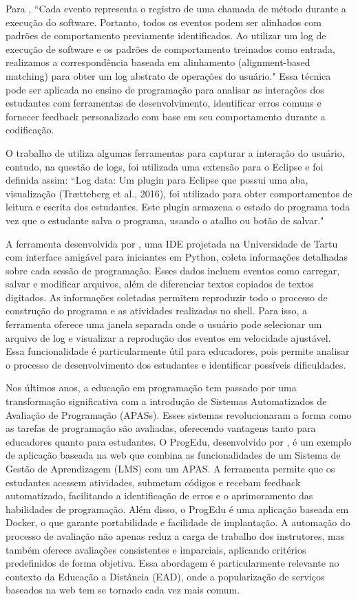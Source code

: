Para \cite{liu2018user}, ``Cada evento representa o registro de uma chamada de método durante a execução do software. Portanto, todos os eventos podem ser alinhados com padrões de comportamento previamente identificados. Ao utilizar um log de execução de software e os padrões de comportamento treinados como entrada, realizamos a correspondência baseada em alinhamento (alignment-based matching) para obter um log abstrato de operações do usuário." Essa técnica pode ser aplicada no ensino de programação para analisar as interações dos estudantes com ferramentas de desenvolvimento, identificar erros comuns e fornecer feedback personalizado com base em seu comportamento durante a codificação.

O trabalho de \cite{mangaroska_exploring_2022} utiliza algumas ferramentas para capturar a interação do usuário, contudo, na questão de logs, foi utilizada uma extensão para o Eclipse e foi definida assim: ``Log data: Um plugin para Eclipse que possui uma aba, visualização (Trætteberg et al., 2016), foi utilizado para obter comportamentos de leitura e escrita dos estudantes. Este plugin armazena o estado do programa toda vez que o estudante salva o programa, usando o atalho ou botão de salvar."

A ferramenta desenvolvida por \cite{annamaa2015thonny}, uma IDE projetada na Universidade de Tartu com interface amigável para iniciantes em Python, coleta informações detalhadas sobre cada sessão de programação. Esses dados incluem eventos como carregar, salvar e modificar arquivos, além de diferenciar textos copiados de textos digitados. As informações coletadas permitem reproduzir todo o processo de construção do programa e as atividades realizadas no shell. Para isso, a ferramenta oferece uma janela separada onde o usuário pode selecionar um arquivo de log e visualizar a reprodução dos eventos em velocidade ajustável. Essa funcionalidade é particularmente útil para educadores, pois permite analisar o processo de desenvolvimento dos estudantes e identificar possíveis dificuldades.

Nos últimos anos, a educação em programação tem passado por uma transformação significativa com a introdução de Sistemas Automatizados de Avaliação de Programação (APASs). Esses sistemas revolucionaram a forma como as tarefas de programação são avaliadas, oferecendo vantagens tanto para educadores quanto para estudantes. O ProgEdu, desenvolvido por \cite{nguyen_analyzing_2023}, é um exemplo de aplicação baseada na web que combina as funcionalidades de um Sistema de Gestão de Aprendizagem (LMS) com um APAS. A ferramenta permite que os estudantes acessem atividades, submetam códigos e recebam feedback automatizado, facilitando a identificação de erros e o aprimoramento das habilidades de programação. Além disso, o ProgEdu é uma aplicação baseada em Docker, o que garante portabilidade e facilidade de implantação. A automação do processo de avaliação não apenas reduz a carga de trabalho dos instrutores, mas também oferece avaliações consistentes e imparciais, aplicando critérios predefinidos de forma objetiva. Essa abordagem é particularmente relevante no contexto da Educação a Distância (EAD), onde a popularização de serviços baseados na web tem se tornado cada vez mais comum.

